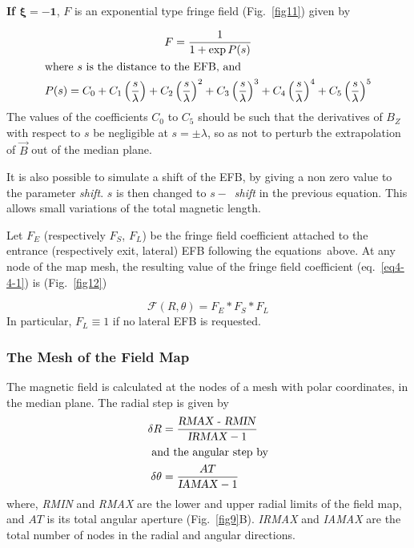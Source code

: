 {\noindent\textbf{If $\mathbf{\xi  = -1}$},  $ F $ is an exponential type
fringe field (Fig.~\ref{fig11}) given by~\cite{Biblio12}  %

 \begin{gather}
	 F = \dfrac{1 }{ 1+ \exp  P(s)}
 	\label{eq4-4-4} \\
\intertext{where $ s $ is the distance to the EFB, and }
    P(s) = C_0
       +C_1 \left(  \dfrac{s }{ \lambda} \right) 
       +C_2 \left( \dfrac{s }{ \lambda} \right)^2 
       + C_3 \left( \dfrac{s }{ \lambda} \right)^3 
       +C_4 \left( \dfrac{s }{ \lambda} \right)^4 
       + C_5 \left(\dfrac{s }{ \lambda} \right)^5 \label{eq4-4-5}
\end{gather}
%
The values of the coefficients $ C_0 $ to $ C_5 $ should be such that the 
derivatives of $ B_Z$ with respect to $ s $ be negligible at $ s=\pm \lambda $, so as not
to perturb the extrapolation of $ \vec B $ out of the median plane.

\noindent It is also possible to simulate a shift of the EFB, by giving a non
zero value to the parameter \textsl{shift}.  $ s $ is then changed to $ s  -$~\textsl{shift} in the 
previous equation.   This allows small variations of the total 
magnetic length. 

\noindent Let $ F_E $ (respectively $ F_S$, $F_L$)   be the fringe field
coefficient attached to the entrance (respectively exit, lateral) EFB following  the equations\ above. At any
node of the map mesh, the resulting value of the fringe field coefficient (eq.~\ref{eq4-4-1}) is 
(Fig.~\ref{fig12})  

$$ \mathcal{F}(R,\theta)= F_E \ast  F_S \ast  F_L $$
%
 In particular, $F_L\equiv 1 $ if no lateral EFB is requested. 

\subsubsection*{The Mesh of the Field Map} 

The magnetic field is calculated at the nodes of a mesh with polar
coordinates, in the median plane.  The radial step is given by 
 \begin{align*}
	 \delta R & = \dfrac{\text{\textsl{RMAX - RMIN}} }{\text{\textsl{IRMAX}}-1} \\
\intertext{ and the angular step by} 
	\delta \theta  & = \dfrac{AT }{ \text{\textsl{IAMAX}}-1} 
 \end{align*}
%
\noindent where, \textsl{RMIN} and  \textsl{RMAX}   are the lower and upper
radial limits of the field map, and $ AT $ is its total angular aperture (Fig.~\ref{fig9}B).  
 \textsl{IRMAX} and  \textsl{IAMAX} are the total number of nodes in the radial and 
 angular directions. 
 

}
